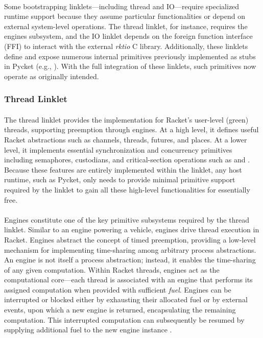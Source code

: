 			\paragraph{}%
				Some bootstrapping linklets—including thread and IO—require specialized runtime support because they assume particular functionalities or depend on external system-level operations. The thread linklet, for instance, requires the engines subsystem, and the IO linklet depends on the foreign function interface (FFI) to interact with the external \emph{rktio} C library. Additionally, these linklets define and expose numerous internal primitives previously implemented as stubs in Pycket (e.g., ). With the full integration of these linklets, such primitives now operate as originally intended.

			\subsubsection{Thread Linklet}

				\paragraph{}%
					The thread linklet provides the implementation for Racket's user-level (green) threads, supporting preemption through engines. At a high level, it defines useful Racket abstractions such as channels, threads, futures, and places. At a lower level, it implements essential synchronization and concurrency primitives including semaphores, custodians, and critical-section operations such as  and . Because these features are entirely implemented within the linklet, any host runtime, such as Pycket, only needs to provide minimal primitive support required by the linklet to gain all these high-level functionalities for essentially free.

				\paragraph{}%
					Engines constitute one of the key primitive subsystems required by the thread linklet. Similar to an engine powering a vehicle, engines drive thread execution in Racket. Engines abstract the concept of timed preemption, providing a low-level mechanism for implementing time-sharing among arbitrary process abstractions. An engine is not itself a process abstraction; instead, it enables the time-sharing of any given computation. Within Racket threads, engines act as the computational core—each thread is associated with an engine that performs its assigned computation when provided with sufficient \emph{fuel}. Engines can be interrupted or blocked either by exhausting their allocated fuel or by external events, upon which a new engine is returned, encapsulating the remaining computation. This interrupted computation can subsequently be resumed by supplying additional fuel to the new engine instance \cite{enginesOriginal}.


